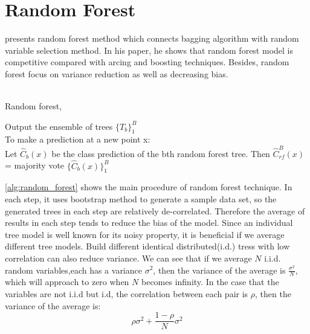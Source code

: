 \section{Random Forest}
\cite{breiman2001random} presents random forest method which connects bagging algorithm with random variable selection method. In his paper, he shows that random forest model is competitive compared with arcing and boosting techniques. Besides, random forest focus on variance reduction as well as decreasing bias.   \\
\\

\begin{algorithm}[H]
	\caption{Random forest, \cite{breiman2001random}}\label{alg:random_forest}
	\nl {}
	\nl Output the ensemble of trees $\{T_b\}_1^B$ \\
	To make a prediction at a new point x:\\
	\nl Let $\hat{C}_b(x)$ be the class prediction of the bth random forest tree. Then $\hat{C}_{rf}^B(x)$= majority vote $\{\hat{C}_b(x)\}_1^{B}$
\end{algorithm} 

\ref{alg:random_forest} shows the main procedure of random forest technique. In each step, it uses bootstrap method to generate a sample data set, so the generated trees in each step are relatively de-correlated. Therefore the average of results in each step tends to reduce the bias of the model. Since an individual tree model is well known for its noisy property, it is beneficial if we average different tree models. Build different identical distributed(i.d.) tress with low correlation can also reduce variance.  We can see that if we average $N$ i.i.d. random variables,each has a variance $\sigma^2$, then the variance of the average is $\frac{\sigma^2}{N}$, which will approach to zero when $N$ becomes infinity. In the case that the variables are not i.i.d but i.d, the correlation between each pair is $\rho$, then the variance of the average is:
\begin{equation}
\rho\sigma^2 +\frac{1-\rho}{N}\sigma^2
\end{equation} 

